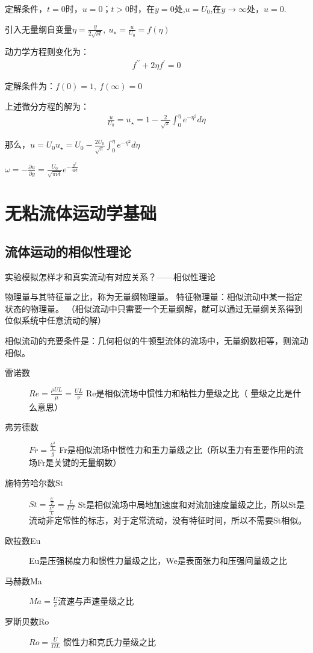 \documentclass[UTF8,12pt]{article}
\begin{document}
定解条件，$t=0$时，$u=0$；$t>0$时，在$y=0$处,$u=U_0$,在$y\rightarrow \infty$处，$u=0$.

引入无量纲自变量$\eta = \frac{y}{2\sqrt{\nu t} },~ u_{\star} = \frac{u}{U_0} = f(\eta ) $

  动力学方程则变化为：
  \begin{align*}
    f^{\prime \prime }  + 2\eta f^{\prime } = 0
  \end{align*}
  
  定解条件为：$f(0) = 1,~ f(\infty) = 0$ 

  上述微分方程的解为：
  \begin{align*}
    \frac{u}{U_0} = u_{\star} = 1 - \frac{2}{\sqrt{\pi}} \int_0^{\eta} e^{-\eta^2}d\eta
  \end{align*}
  
  那么，$u = U_0 u_{\star} = U_0 - \frac{2U_0}{\sqrt{\pi}} \int_0^{\eta} e^{-\eta^2}d\eta$

$\omega = -\frac{\partial u}{\partial y} = \frac{U_0}{\sqrt{\pi \nu t}}e^{-\frac{y^2}{4\nu t}}$

\section{无粘流体运动学基础}

\subsection{流体运动的相似性理论}

实验模拟怎样才和真实流动有对应关系？——相似性理论

物理量与其特征量之比，称为无量纲物理量。
特征物理量：相似流动中某一指定状态的物理量。
（相似流动中只需要一个无量纲解，就可以通过无量纲关系得到位似系统中任意流动的解）

相似流动的充要条件是：几何相似的牛顿型流体的流场中，无量纲数相等，则流动相似。

\begin{description}
    \item[雷诺数] $Re = \frac{\rho UL}{\mu} = \frac{UL}{\nu}$ Re是相似流场中惯性力和粘性力量级之比（{\color{red} 量级之比是什么意思}） 
    \item[弗劳德数] $Fr = \frac{\frac{U^2}{L}}{g}$ Fr是相似流场中惯性力和重力量级之比（所以重力有重要作用的流场Fr是关键的无量纲数）
    \item[施特劳哈尔数St] $St = \frac{\frac{U}{T}}{\frac{U^2}{L}} = \frac{L}{UT}$ St是相似流场中局地加速度和对流加速度量级之比，所以St是流动非定常性的标志，对于定常流动，没有特征时间，所以不需要St相似。 
    \item[欧拉数Eu] Eu是压强梯度力和惯性力量级之比，We是表面张力和压强间量级之比 
    \item[马赫数Ma] $Ma = \frac{U}{c}$流速与声速量级之比
    \item[罗斯贝数Ro] $Ro = \frac{U}{\Omega L}$ 惯性力和克氏力量级之比 
\end{description}
\end{document}
